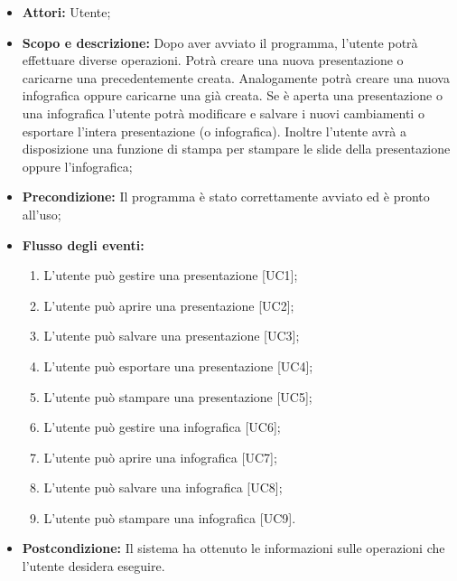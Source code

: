 \begin{itemize}
	\item \textbf{Attori:} Utente;
	\item \textbf{Scopo e descrizione:} Dopo aver avviato il programma, l'utente potrà effettuare diverse operazioni. Potrà creare una nuova presentazione o caricarne una precedentemente creata. Analogamente potrà creare una nuova infografica oppure caricarne una già creata. Se è aperta una presentazione o una infografica l'utente potrà modificare e salvare i nuovi cambiamenti o esportare l'intera presentazione (o infografica). Inoltre l'utente avrà a disposizione una funzione di stampa per stampare le slide della presentazione oppure l'infografica;
	\item \textbf{Precondizione:} Il programma è stato correttamente avviato ed è pronto all'uso;
	\item \textbf{Flusso degli eventi:}
	\begin{enumerate}
		\item L'utente può gestire una presentazione [UC1];
		\item L'utente può aprire una presentazione [UC2];
		\item L'utente può salvare una presentazione [UC3];
		\item L'utente può esportare una presentazione [UC4];
		\item L'utente può stampare una presentazione [UC5];
		\item L'utente può gestire una infografica [UC6];
		\item L'utente può aprire una infografica [UC7];
		\item L'utente può salvare una infografica [UC8];
		\item L'utente può stampare una infografica [UC9].
	\end{enumerate}
	\item \textbf{Postcondizione:} Il sistema ha ottenuto le informazioni sulle operazioni che l’utente desidera eseguire.
\end{itemize}

%

%

















